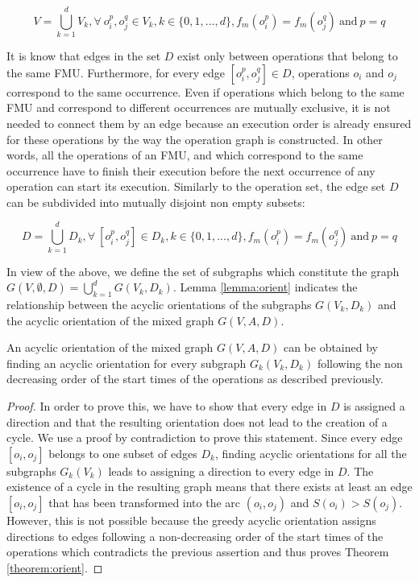 \begin{equation}
V = \bigcup_{k=1}^d V_k, \forall\ o_i^p, o_j^q \in V_k, k \in \{0, 1, \ldots, d\}, f_m(o_i^p)=f_m(o_j^q)\ \text{and}\ p = q
\label{eq:opsubset}
\end{equation}

It is know that edges in the set $D$ exist only between operations that belong to the same FMU. Furthermore, for every edge $[o_i^p,o_j^q] \in D$, operations $o_i$ and $o_j$ correspond to the same occurrence. Even if operations which belong to the same FMU and correspond to different occurrences are mutually exclusive, it is not needed to connect them by an edge because an execution order is already ensured for these operations by the way the operation graph is constructed. In other words, all the operations of an FMU, and which correspond to the same occurrence have to finish their execution before the next occurrence of any operation can start its execution. Similarly to the operation set, the edge set $D$ can be subdivided into mutually disjoint non empty subsets:

\begin{equation}
D = \bigcup_{k=1}^d D_k, \forall\ [o_i^p, o_j^q] \in D_k, k \in \{0, 1, \ldots, d\}, f_m(o_i^p)=f_m(o_j^q)\ \text{and}\ p = q
\label{eq:opsubset}
\end{equation}

In view of the above, we define the set of subgraphs which constitute the graph $G(V,\emptyset,D) = \bigcup_{k=1}^d G(V_k,D_k)$. Lemma \ref{lemma:orient} indicates the relationship between the acyclic orientations of the subgraphs $G(V_k,D_k)$ and the acyclic orientation of the mixed graph $G(V,A,D)$.

\begin{theorem}
An acyclic orientation of the mixed graph $G(V,A,D)$ can be obtained by finding an acyclic orientation for every subgraph $G_k(V_k,D_k)$ following the non decreasing order of the start times of the operations as described previously.
\label{theorem:orient}
\end{theorem}

\begin{proof}
In order to prove this, we have to show that every edge in $D$ is assigned a	direction and that the resulting orientation does not lead to the creation of a cycle. We use a proof by contradiction to prove this statement. Since every edge $[o_i, o_j]$ belongs to one subset of edges $D_k$, finding acyclic orientations for all the subgraphs $G_k(V_k)$ leads to assigning a direction to every edge in $D$. The existence of a cycle in the resulting graph means that there exists at least an edge $[o_i,o_j]$ that has been transformed into the arc $(o_i,o_j)$ and $S(o_i) > S(o_j)$. However, this is not possible because the greedy acyclic orientation assigns directions to edges following a non-decreasing order of the start times of the operations which contradicts the previous assertion and thus proves Theorem \ref{theorem:orient}.
\end{proof}

